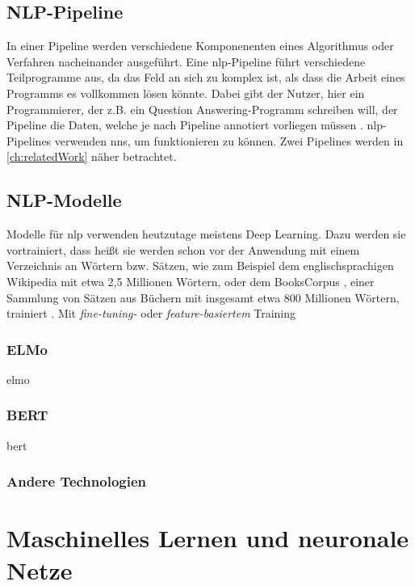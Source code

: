 \subsection{NLP-Pipeline}
In einer Pipeline werden verschiedene Komponenenten eines Algorithmus oder Verfahren nacheinander ausgeführt.
Eine \ac{nlp}-Pipeline führt verschiedene Teilprogramme aus, da das Feld an sich zu komplex ist, als dass die Arbeit eines Programms es vollkommen lösen könnte.
Dabei gibt der Nutzer, hier ein Programmierer, der z.B. ein Question Answering-Programm schreiben will, der Pipeline die Daten, welche je nach Pipeline annotiert vorliegen müssen \citep{curatorpipeline}.
\ac{nlp}-Pipelines verwenden \acp{nn}, um funktionieren zu können.
Zwei Pipelines werden in \cref{ch:relatedWork} näher betrachtet.

\subsection{NLP-Modelle}

Modelle für \acl{nlp} verwenden heutzutage meistens Deep Learning.
Dazu werden sie vortrainiert, dass heißt sie werden schon vor der Anwendung mit einem Verzeichnis an Wörtern bzw. Sätzen,
wie zum Beispiel dem englischsprachigen Wikipedia mit etwa 2,5 Millionen Wörtern,
oder dem BooksCorpus \citep{bookscorpus},
einer Sammlung von Sätzen aus Büchern mit insgesamt etwa 800 Millionen Wörtern,
trainiert \citep{BERT}.
Mit \emph{fine-tuning-} oder \emph{feature-basiertem} Training

\subsubsection{ELMo}
\ac{elmo}

\subsubsection{BERT}
\ac{bert}

\subsubsection{Andere Technologien}

\section{Maschinelles Lernen und neuronale Netze}

